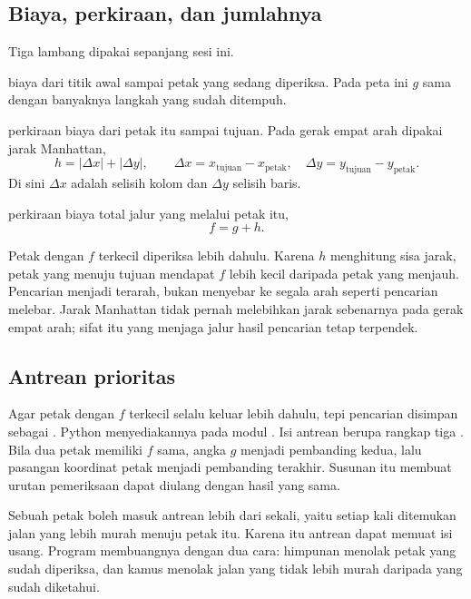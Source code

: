 \subsection*{Biaya, perkiraan, dan jumlahnya}

Tiga lambang dipakai sepanjang sesi ini.

\begin{description}[leftmargin=1.4em, itemsep=0.15em]
  \item[$g$] biaya dari titik awal sampai petak yang sedang diperiksa. Pada
        peta ini $g$ sama dengan banyaknya langkah yang sudah ditempuh.
  \item[$h$] perkiraan biaya dari petak itu sampai tujuan. Pada gerak empat
        arah dipakai jarak Manhattan,
        \[
          h = |\Delta x| + |\Delta y|,
          \qquad
          \Delta x = x_{\text{tujuan}} - x_{\text{petak}},
          \quad
          \Delta y = y_{\text{tujuan}} - y_{\text{petak}} .
        \]
        Di sini $\Delta x$ adalah selisih kolom dan $\Delta y$ selisih baris.
  \item[$f$] perkiraan biaya total jalur yang melalui petak itu,
        \[
          f = g + h .
        \]
\end{description}

Petak dengan $f$ terkecil diperiksa lebih dahulu. Karena $h$ menghitung sisa
jarak, petak yang menuju tujuan mendapat $f$ lebih kecil daripada petak yang
menjauh. Pencarian menjadi terarah, bukan menyebar ke segala arah seperti
pencarian melebar. Jarak Manhattan tidak pernah melebihkan jarak sebenarnya
pada gerak empat arah; sifat itu yang menjaga jalur hasil pencarian tetap
terpendek.

\subsection*{Antrean prioritas}

Agar petak dengan $f$ terkecil selalu keluar lebih dahulu, tepi pencarian
disimpan sebagai . Python menyediakannya pada
modul . Isi antrean berupa rangkap tiga
. Bila dua petak memiliki $f$ sama, angka $g$ menjadi
pembanding kedua, lalu pasangan koordinat petak menjadi pembanding terakhir.
Susunan itu membuat urutan pemeriksaan dapat diulang dengan hasil yang sama.

Sebuah petak boleh masuk antrean lebih dari sekali, yaitu setiap kali
ditemukan jalan yang lebih murah menuju petak itu. Karena itu antrean dapat
memuat isi usang. Program membuangnya dengan dua cara: himpunan
 menolak petak yang sudah diperiksa, dan kamus 
menolak jalan yang tidak lebih murah daripada yang sudah diketahui.

